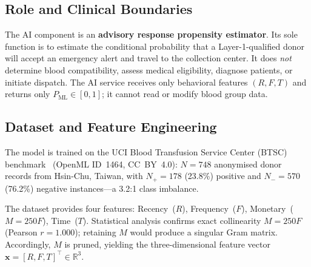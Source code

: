 \documentclass[conference]{IEEEtran}
\begin{document}
\subsection{Role and Clinical Boundaries}
The AI component is an \textbf{advisory response propensity estimator}.
Its sole function is to estimate the conditional probability that a
Layer-1-qualified donor will accept an emergency alert and travel to
the collection center. It does \emph{not} determine blood compatibility,
assess medical eligibility, diagnose patients, or initiate dispatch.
The AI service receives only behavioral features $(R, F, T)$ and returns
only $P_\mathrm{ML}\in[0,1]$; it cannot read or modify blood group data.

\subsection{Dataset and Feature Engineering}
The model is trained on the UCI Blood Transfusion Service Center (BTSC)
benchmark~\cite{yeh2009} (OpenML ID~1464, CC~BY~4.0): $N=748$ anonymised
donor records from Hsin-Chu, Taiwan, with $N_+{=}178$ (23.8\%) positive
and $N_-{=}570$ (76.2\%) negative instances---a 3.2:1 class imbalance.

The dataset provides four features: Recency~($R$), Frequency~($F$),
Monetary~($M{=}250F$), Time~($T$). Statistical analysis confirms exact
collinearity $M=250F$ (Pearson $r=1.000$); retaining $M$ would produce
a singular Gram matrix. Accordingly, $M$ is pruned, yielding the
three-dimensional feature vector $\mathbf{x}=[R,F,T]^\top\in\mathbb{R}^3$.
\end{document}
